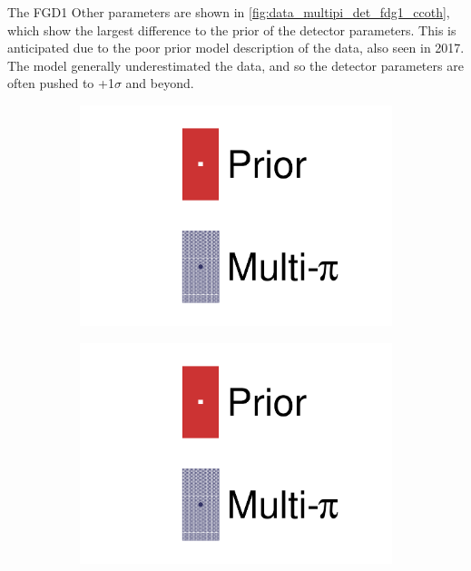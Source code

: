 The FGD1 Other parameters are shown in \autoref{fig:data_multipi_det_fdg1_ccoth}, which show the largest difference to the prior of the detector parameters. This is anticipated due to the poor prior model description of the data, also seen in 2017. The model generally underestimated the data, and so the detector parameters are often pushed to +1$\sigma$ and beyond.
\begin{figure}[h]
	\centering
	\begin{subfigure}[t]{0.1\textwidth}
		\includegraphics[width=\textwidth,page=1, trim={0mm 120mm 40mm 20mm}, clip]{figures/mach3/2018/data/2018a_FixedCov_RedCov_Mpi_Data_merge_drawPar_withDet}
	\end{subfigure}
	\begin{subfigure}[t]{0.1\textwidth}
		\includegraphics[width=\textwidth,page=1, trim={0mm 20mm 40mm 120mm}, clip]{figures/mach3/2018/data/2018a_FixedCov_RedCov_Mpi_Data_merge_drawPar_withDet}
	\end{subfigure}


\end{figure}
